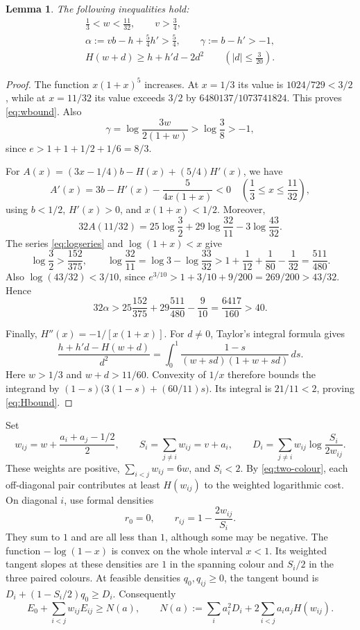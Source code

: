 \documentclass[11pt]{article}
\newtheorem{lemma}[theorem]{Lemma}
\begin{document}
\begin{lemma}\label{lem:entropy}
The following inequalities hold:
\begin{gather}
 \frac13<w<\frac{11}{32},\qquad v>\frac34,\label{eq:wbound}\\
 \alpha:=vb-h+\frac54h'>\frac54,
 \qquad \gamma:=b-h'>-1,\label{eq:coefficients}\\
 H(w+d)\ge h+h'd-2d^2\qquad\left(|d|\le\frac3{20}\right).
 \label{eq:Hbound}
\end{gather}
\end{lemma}
\begin{proof}
The function $x(1+x)^5$ increases. At $x=1/3$ its value is
$1024/729<3/2$, while at $x=11/32$ its value exceeds $3/2$ by
$6480137/1073741824$. This proves \eqref{eq:wbound}.
Also
\[
 \gamma=\log\frac{3w}{2(1+w)}>\log\frac38>-1,
\]
since $e>1+1+1/2+1/6=8/3$.

For $A(x)=(3x-1/4)b-H(x)+(5/4)H'(x)$, we have
\[
 A'(x)=3b-H'(x)-\frac{5}{4x(1+x)}<0
 \quad\left(\frac13\le x\le\frac{11}{32}\right),
\]
using $b<1/2$, $H'(x)>0$, and $x(1+x)<1/2$. Moreover,
\[
 32A(11/32)=25\log\frac32+29\log\frac{32}{11}
                  -3\log\frac{43}{32}.
\]
The series \eqref{eq:logseries} and $\log(1+x)<x$ give
\[
 \log\frac32>\frac{152}{375},\qquad
 \log\frac{32}{11}=\log3-\log\frac{33}{32}
 >1+\frac1{12}+\frac1{80}-\frac1{32}=\frac{511}{480}.
\]
Also $\log(43/32)<3/10$, since
$e^{3/10}>1+3/10+9/200=269/200>43/32$. Hence
\[
 32\alpha>25\frac{152}{375}+29\frac{511}{480}-\frac9{10}
 =\frac{6417}{160}>40.
\]

Finally, $H''(x)=-1/[x(1+x)]$. For $d\ne0$, Taylor's integral formula
gives
\[
 \frac{h+h'd-H(w+d)}{d^2}
 =\int_0^1\frac{1-s}{(w+sd)(1+w+sd)}\,ds.
\]
Here $w>1/3$ and $w+d>11/60$. Convexity of $1/x$ therefore bounds
the integrand by
$(1-s)\bigl(3(1-s)+(60/11)s\bigr)$.
Its integral is $21/11<2$, proving \eqref{eq:Hbound}.
\end{proof}

Set
\[
 w_{ij}=w+\frac{a_i+a_j-1/2}{2},\qquad
 S_i=\sum_{j\ne i}w_{ij}=v+a_i,
 \qquad
 D_i=\sum_{j\ne i}w_{ij}\log\frac{S_i}{2w_{ij}}.
\]
These weights are positive, $\sum_{i<j}w_{ij}=6w$, and $S_i<2$.
By \eqref{eq:two-colour}, each off-diagonal pair contributes at least
$H(w_{ij})$ to the weighted logarithmic cost. On diagonal $i$, use
formal densities
\[
 r_0=0,\qquad r_{ij}=1-\frac{2w_{ij}}{S_i}.
\]
They sum to $1$ and are all less than $1$, although some may be negative.
The function $-\log(1-x)$ is convex on the whole interval $x<1$.
Its weighted tangent slopes at these densities are $1$ in the spanning
colour and $S_i/2$ in the three paired colours. At feasible densities
$q_0,q_{ij}\ge0$, the tangent bound is
$D_i+(1-S_i/2)q_0\ge D_i$. Consequently
\begin{equation}\label{eq:dual}
 E_0+\sum_{i<j}w_{ij}E_{ij}\ge N(a),
 \qquad
 N(a):=\sum_i a_i^2D_i+2\sum_{i<j}a_i a_jH(w_{ij}).
\end{equation}
\end{document}
